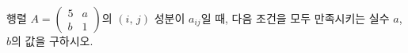 행렬 $A=\begin{pmatrix} 5 & a \\ b & 1 \end{pmatrix}$의 $(i,\,j)$ 성분이 $a_{ij}$일 때, 다음 조건을 모두 만족시키는 실수 $a$, $b$의 값을 구하시오. 
